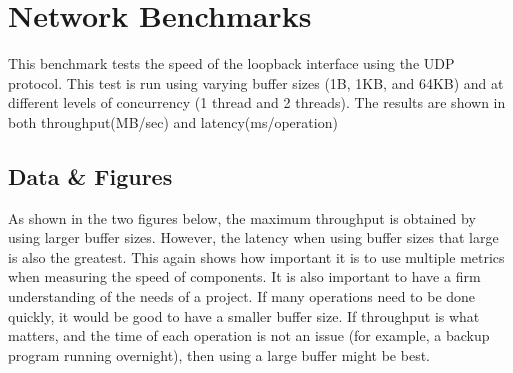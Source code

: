 \documentclass{article}
\begin{document}
\pagebreak
\section{Network Benchmarks}
This benchmark tests the speed of the loopback interface using the UDP protocol.  This test is run using varying buffer sizes (1B, 1KB, and 64KB) and at different levels of concurrency (1 thread and 2 threads).  The results are shown in both throughput(MB/sec) and latency(ms/operation)
\subsection{Data \& Figures}
As shown in the two figures below, the maximum throughput is obtained by using larger buffer sizes.  However, the latency when using buffer sizes that large is also the greatest.  This again shows how important it is to use multiple metrics when measuring the speed of components.  It is also important to have a firm understanding of the needs of a project.  If many operations need to be done quickly, it would be good to have a smaller buffer size.  If throughput is what matters, and the time of each operation is not an issue (for example, a backup program running overnight), then using a large buffer might be best.
\begin{figure}[H]
\end{figure}
\begin{figure}[H]
\end{figure}
\end{document}
